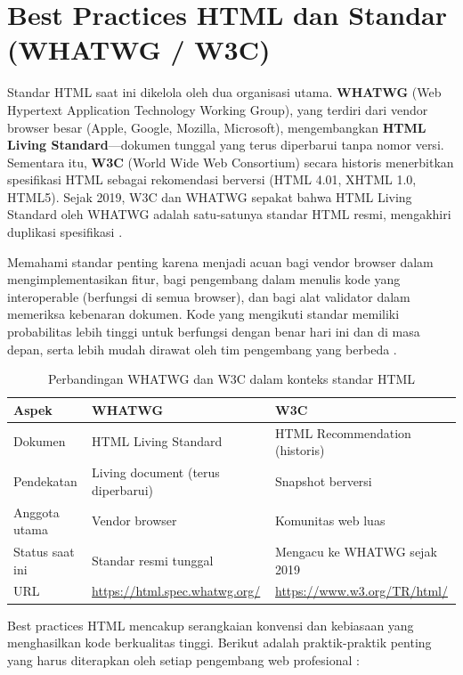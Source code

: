 ﻿\section{Best Practices HTML dan Standar (WHATWG / W3C)}

Standar HTML saat ini dikelola oleh dua organisasi utama. \textbf{WHATWG} (Web Hypertext Application Technology Working Group), yang terdiri dari vendor browser besar (Apple, Google, Mozilla, Microsoft), mengembangkan \textbf{HTML Living Standard}---dokumen tunggal yang terus diperbarui tanpa nomor versi. Sementara itu, \textbf{W3C} (World Wide Web Consortium) secara historis menerbitkan spesifikasi HTML sebagai rekomendasi berversi (HTML 4.01, XHTML 1.0, HTML5). Sejak 2019, W3C dan WHATWG sepakat bahwa HTML Living Standard oleh WHATWG adalah satu-satunya standar HTML resmi, mengakhiri duplikasi spesifikasi \cite{whatwgHtml}.

Memahami standar penting karena menjadi acuan bagi vendor browser dalam mengimplementasikan fitur, bagi pengembang dalam menulis kode yang interoperable (berfungsi di semua browser), dan bagi alat validator dalam memeriksa kebenaran dokumen. Kode yang mengikuti standar memiliki probabilitas lebih tinggi untuk berfungsi dengan benar hari ini dan di masa depan, serta lebih mudah dirawat oleh tim pengembang yang berbeda \cite{mdnHtmlIntro}.

\begin{table}[H]
\centering
\begin{tabular}{|P{3cm}|P{4.5cm}|P{4.5cm}|}
\hline
\textbf{Aspek} & \textbf{WHATWG} & \textbf{W3C} \\
\hline
Dokumen & HTML Living Standard & HTML Recommendation (historis) \\
\hline
Pendekatan & Living document (terus diperbarui) & Snapshot berversi \\
\hline
Anggota utama & Vendor browser & Komunitas web luas \\
\hline
Status saat ini & Standar resmi tunggal & Mengacu ke WHATWG sejak 2019 \\
\hline
URL & \url{https://html.spec.whatwg.org/} & \url{https://www.w3.org/TR/html/} \\
\hline
\end{tabular}
\caption{Perbandingan WHATWG dan W3C dalam konteks standar HTML}
\end{table}

Best practices HTML mencakup serangkaian konvensi dan kebiasaan yang menghasilkan kode berkualitas tinggi. Berikut adalah praktik-praktik penting yang harus diterapkan oleh setiap pengembang web profesional \cite{webdevHtml}:

